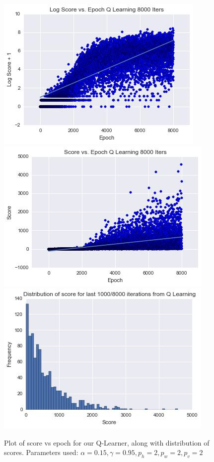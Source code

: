 \documentclass[letterpaper]{article}
\begin{document}
\begin{figure}
\centering
\includegraphics[scale=0.65]{Q_8000_log}
\includegraphics[scale=0.65]{Q_8000_score}
\includegraphics[scale=0.65]{Q_8000_distribution}
\caption{Plot of score vs epoch for our Q-Learner, along with distribution of scores. Parameters used: $\alpha = 0.15, \gamma = 0.95, p_h = 2, p_w = 2,p_v = 2$}
\label{fig:qscore}
\end{figure}
\end{document}
